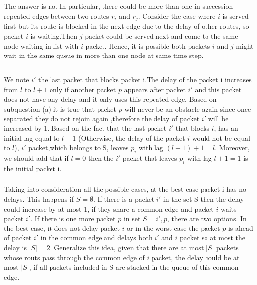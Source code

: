 \documentclass[11pt]{537homework}
\begin{document}
\subsection{}
The answer is no. In particular, there could be more than one in succession repeated edges between two routes $r_i$ and $r_j$. Consider the case where $i$ is served first but its route is blocked in the next edge due to the delay of other routes, so packet $i$ is waiting.Then $j$ packet could be served next and come to the same node waiting in list with $i$ packet. Hence, it is possible both packets $i$ and $j$ might wait in the same queue in more than one node at same time step. 
\subsection{}
\subsubsection{}
We note $i'$ the last packet that blocks packet i.The delay of the packet i increases from $l$ to $l+1$ only if another packet $p$ appears after packet $i'$ and this packet does not have any delay and it only uses this repeated edge. Based on subquestion (a) it is true that packet $p$ will never be an obstacle again since once separated they do not rejoin again ,therefore the delay of packet $i'$ will be increased by 1. Based on the fact that the last packet $i'$ that blocks $i$, has an initial lag equal to $l-1$ (Otherwise, the delay of the packet $i$ would not be equal to $l$), $i'$ packet,which belongs to S, leaves $p_i$ with lag $(l-1) + 1 = l$. Moreover, we should add that if $l=0$ then the $i'$ packet that leaves $p_i$ with lag $l+1 = 1$ is the initial packet i.
\subsubsection{}
Taking into consideration all the possible cases, at the best case packet i has no delays. This happens if $S = \emptyset$. If there is a packet $i'$ in the set S then the delay could increase by at most 1, if they share a common edge and packet $i$ waits packet $i'$. If there is one more packet $p$ in set $S = {i',p}$, there are two options. In the best case, it does not delay packet $i$ or in the worst case the packet $p$ is ahead of packet $i'$ in the common edge and delays both $i'$ and $i$ packet so at most the delay is $|S|=2$. Generalize this idea, given that there are at most $|S|$ packets whose routs pass through the common edge of $i$ packet, the delay could be at most $|S|$, if all packets included in S are stacked in the queue of this common edge.
\end{document}
